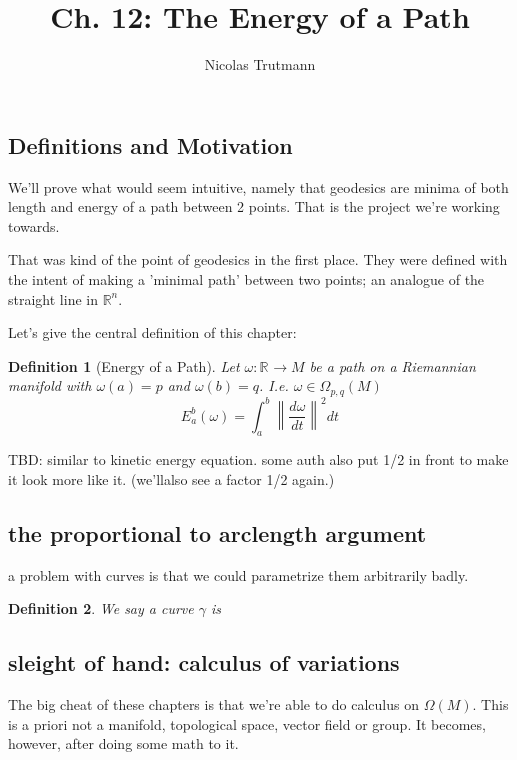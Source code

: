 \documentclass{article}
\title{Ch. 12: The Energy of a Path}
\author{Nicolas Trutmann}
\date{}
\newtheorem{def}{Definition}
\renewcommand{\Rn}[1][n]{\mathbb{R}^{#1}}
\newcommand{\Absbars}[1]{\left\lVert#1\right\rVert}
\newcommand{\rmfd}[1]{Riemannian manifold}
\newcommand{\OM}{\Omega(M)}
\begin{document}
\maketitle


\subsection{Definitions and Motivation}

We'll prove what would seem intuitive, namely that geodesics are minima of both length and energy of
a path between 2 points. That is the project we're working towards.

That was kind of the point of geodesics in the first place. They were defined with the intent of
making a 'minimal path' between two points; an analogue of the straight line in $\Rn$.

Let's give the central definition of this chapter:

\begin{def}[Energy of a Path]
Let $\omega : \Rn[] \rightarrow M $ be a path on a \rmfd, with $\omega(a) = p$ and $\omega(b) = q$.
I.e. $\omega \in \Omega_{p,q}(M)$
\[ E_a^b(\omega) = \int_a^b \Absbars{\frac{d\omega}{dt}}^2 dt \]
\end{def}

TBD: similar to kinetic energy equation. some auth also put 1/2 in front to make it look more like it. (we'llalso see a factor 1/2 again.)

\subsection{the proportional to arclength argument}

a problem with curves is that we could parametrize them arbitrarily badly.

\begin{def}
    \label{def:reparametrization}
    We say a curve $\gamma$ is
\end{def}





\subsection{sleight of hand: calculus of variations}

The big cheat of these chapters is that we're able to do calculus on $\OM$.
This is a priori not a manifold, topological space, vector field or group.
It becomes, however, after doing some math to it.
\end{document}
